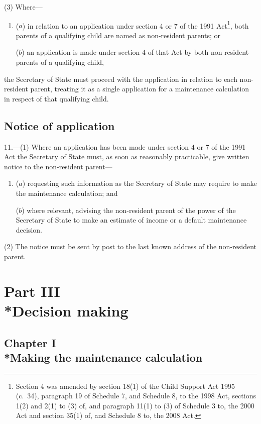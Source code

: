 \documentclass[12pt,a4paper]{article}
\begin{document}
(3) Where—
\begin{enumerate}\item[]
($a$) in relation to an application under section 4 or 7 of the 1991 Act\footnote{Section 4 was amended by section 18(1) of the Child Support Act 1995 (c.~34), paragraph 19 of Schedule 7, and Schedule 8, to the 1998 Act, sections 1(2) and 2(1) to (3) of, and paragraph 11(1) to (3) of Schedule 3 to, the 2000 Act and section 35(1) of, and Schedule 8 to, the 2008 Act.}, both parents of a qualifying child are named as non-resident parents; or

($b$) an application is made under section 4 of that Act by both non-resident parents of a qualifying child,
\end{enumerate}
the Secretary of State must proceed with the application in relation to each non-resident parent, treating it as a single application for a maintenance calculation in respect of that qualifying child.

\subsection[11. Notice of application]{Notice of application}

11.---(1)  Where an application has been made under section 4 or 7 of the 1991 Act the Secretary of State must, as soon as reasonably practicable, give written notice to the non-resident parent—
\begin{enumerate}\item[]
($a$) requesting such information as the Secretary of State may require to make the maintenance calculation; and

($b$) where relevant, advising the non-resident parent of the power of the Secretary of State to make an estimate of income or a default maintenance decision.
\end{enumerate}

(2) The notice must be sent by post to the last known address of the non-resident parent.

\section[Part III --- Decision making]{Part III\\*Decision making}

\subsection[Chapter I --- Making the maintenance calculation]{Chapter I\\*Making the maintenance calculation}
\end{document}
